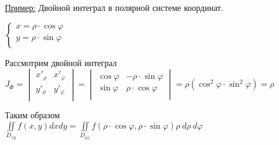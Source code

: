 \underline{Пример:} Двойной интеграл в полярной системе координат.

$\begin{cases}
	x = \rho \cdot \cos{\varphi} \\
	y = \rho \cdot \sin{\varphi} \\
\end{cases} $


Рассмотрим двойной интеграл \\
$ J_\Phi = 
\begin{vmatrix}
	x'_\rho & x'_\varphi \\
	y'_\rho & y'_\varphi \\
\end{vmatrix} = 
\begin{vmatrix}
	\cos{\varphi} & - \rho \cdot \sin{\varphi} \\
	\sin{\varphi} & \rho \cdot \cos{\varphi} \\
\end{vmatrix} = 
\rho \left( \cos^2{\varphi} \cdot \sin^2{\varphi} \right) = \rho$

Таким образом \\
$\boxed{
\iint\limits_{D_{xy}} f(x,y) dxdy = \iint\limits_{D_{\rho \varphi}} f \left( \rho \cdot \cos{\varphi}, \rho \cdot \sin{\varphi} \right) \rho \ d\rho \ d\varphi
}$
























